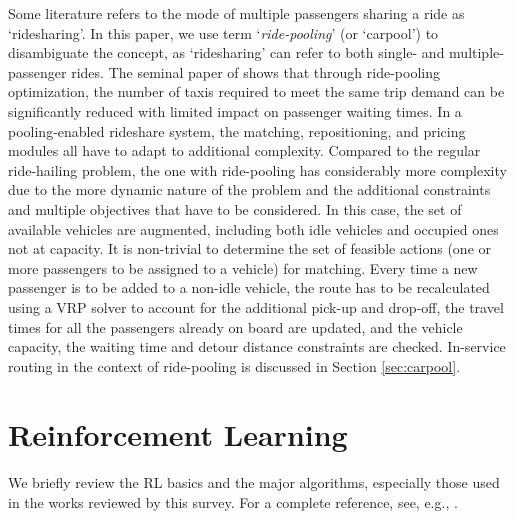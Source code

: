\documentclass{article}
\newcommand{\tq}[1]{\textcolor{red}{#1}}
\begin{document}
Some literature refers to the mode of multiple passengers sharing a ride as `ridesharing'. In this paper, we use term `\emph{ride-pooling}' (or `carpool') to disambiguate the concept, as `ridesharing' can refer to both single- and multiple-passenger rides. The seminal paper of \cite{alonso2017demand} shows that through ride-pooling optimization, the number of taxis required to meet the same trip demand can be significantly reduced with limited impact on passenger waiting times. In a pooling-enabled rideshare system, the matching, repositioning, and pricing modules all have to adapt to additional complexity.
Compared to the regular ride-hailing problem, the one with ride-pooling has considerably more complexity due to the more dynamic nature of the problem and the additional constraints and multiple objectives that have to be considered. 
In this case, the set of available vehicles are augmented, including both idle vehicles and occupied ones not at capacity. It is non-trivial to determine the set of feasible actions (one or more passengers to be assigned to a vehicle) for matching.
Every time a new passenger is to be added to a non-idle vehicle, the route has to be recalculated using a VRP solver to account for the additional pick-up and drop-off, the travel times for all the passengers already on board are updated, and the vehicle capacity, the waiting time and detour distance constraints are checked.  In-service routing in the context of ride-pooling is discussed in Section \ref{sec:carpool}.





\section{Reinforcement Learning}\label{sec:rl}
We briefly review the RL basics and the major algorithms, especially those used in the works reviewed by this survey. For a complete reference, see, e.g., \citep{sutton2018reinforcement}.
\end{document}
